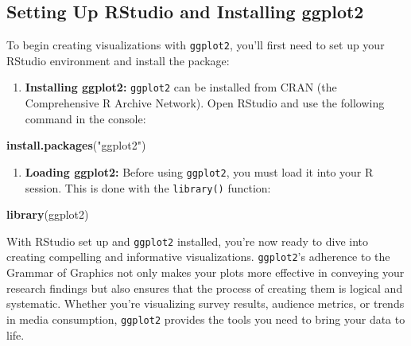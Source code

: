 \documentclass[
]{book}
\newenvironment{Shaded}{\begin{snugshade}}{\end{snugshade}}
\newcommand{\FunctionTok}[1]{\textcolor[rgb]{0.13,0.29,0.53}{\textbf{#1}}}
\newcommand{\NormalTok}[1]{#1}
\newcommand{\StringTok}[1]{\textcolor[rgb]{0.31,0.60,0.02}{#1}}
\providecommand{\tightlist}{%
  \setlength{\itemsep}{0pt}\setlength{\parskip}{0pt}}
\begin{document}
\subsection*{Setting Up RStudio and Installing ggplot2}\label{setting-up-rstudio-and-installing-ggplot2}

To begin creating visualizations with \texttt{ggplot2}, you'll first need to set up your RStudio environment and install the package:

\begin{enumerate}
\def\labelenumi{\arabic{enumi}.}
\tightlist
\item
  \textbf{Installing ggplot2:} \texttt{ggplot2} can be installed from CRAN (the Comprehensive R Archive Network). Open RStudio and use the following command in the console:
\end{enumerate}

\begin{Shaded}
\begin{Highlighting}[]
\FunctionTok{install.packages}\NormalTok{(}\StringTok{"ggplot2"}\NormalTok{)}
\end{Highlighting}
\end{Shaded}

\begin{enumerate}
\def\labelenumi{\arabic{enumi}.}
\setcounter{enumi}{1}
\tightlist
\item
  \textbf{Loading ggplot2:} Before using \texttt{ggplot2}, you must load it into your R session. This is done with the \texttt{library()} function:
\end{enumerate}

\begin{Shaded}
\begin{Highlighting}[]
\FunctionTok{library}\NormalTok{(ggplot2)}
\end{Highlighting}
\end{Shaded}

With RStudio set up and \texttt{ggplot2} installed, you're now ready to dive into creating compelling and informative visualizations. \texttt{ggplot2}'s adherence to the Grammar of Graphics not only makes your plots more effective in conveying your research findings but also ensures that the process of creating them is logical and systematic. Whether you're visualizing survey results, audience metrics, or trends in media consumption, \texttt{ggplot2} provides the tools you need to bring your data to life.
\end{document}

